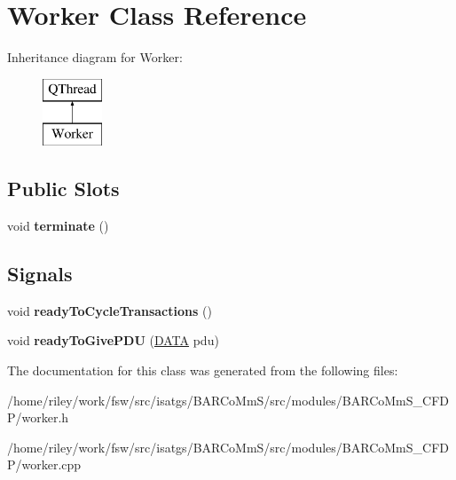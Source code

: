 \hypertarget{class_worker}{}\section{Worker Class Reference}
\label{class_worker}
Inheritance diagram for Worker\+:\begin{figure}[H]
\begin{center}
\leavevmode
\includegraphics[height=2.000000cm]{class_worker}
\end{center}
\end{figure}
\subsection*{Public Slots}
\begin{DoxyCompactItemize}
\item 
void {\bfseries terminate} ()\hypertarget{class_worker_a87ed5c03d94de44fe6de8628c2b1a622}{}\label{class_worker_a87ed5c03d94de44fe6de8628c2b1a622}

\end{DoxyCompactItemize}
\subsection*{Signals}
\begin{DoxyCompactItemize}
\item 
void {\bfseries ready\+To\+Cycle\+Transactions} ()\hypertarget{class_worker_adb8e0fc26a430ba814a8a9dcdd7a470a}{}\label{class_worker_adb8e0fc26a430ba814a8a9dcdd7a470a}

\item 
void {\bfseries ready\+To\+Give\+P\+DU} (\hyperlink{struct_c_f_d_p___d_a_t_a}{D\+A\+TA} pdu)\hypertarget{class_worker_a8644e084567a147b1c950cba574b569a}{}\label{class_worker_a8644e084567a147b1c950cba574b569a}

\end{DoxyCompactItemize}


The documentation for this class was generated from the following files\+:\begin{DoxyCompactItemize}
\item 
/home/riley/work/fsw/src/isatgs/\+B\+A\+R\+Co\+Mm\+S/src/modules/\+B\+A\+R\+Co\+Mm\+S\+\_\+\+C\+F\+D\+P/worker.\+h\item 
/home/riley/work/fsw/src/isatgs/\+B\+A\+R\+Co\+Mm\+S/src/modules/\+B\+A\+R\+Co\+Mm\+S\+\_\+\+C\+F\+D\+P/worker.\+cpp\end{DoxyCompactItemize}
